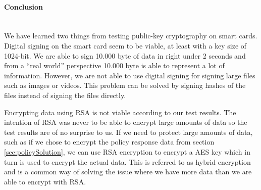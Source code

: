 \paragraph{Conclusion}\mbox{}\\
We have learned two things from testing public-key cryptography on smart cards. Digital signing on the smart card seem to be viable, at least with a key size of 1024-bit. We are able to sign 10.000 byte of data in right under 2 seconds and from a ``real world'' perspective 10.000 byte is able to represent a lot of information. However, we are not able to use digital signing for signing large files such as images or videos. This problem can be solved by signing hashes of the files instead of signing the files directly.

Encrypting data using RSA is not viable according to our test results. The intention of RSA was never to be able to encrypt large amounts of data so the test results are of no surprise to us. If we need to protect large amounts of data, such as if we chose to encrypt the policy response data from section \ref{sec:policySolution}, we can use RSA encryption to encrypt a AES key which in turn is used to encrypt the actual data. This is referred to as hybrid encryption and is a common way of solving the issue where we have more data than we are able to encrypt with RSA.
